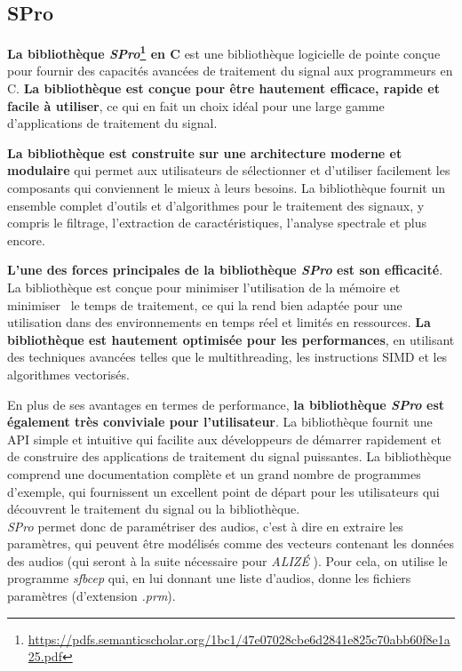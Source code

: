 \subsection{SPro}
\label{subsec:SPro}

\textbf{La bibliothèque \textit{SPro}\footnote{\url{https://pdfs.semanticscholar.org/1bc1/47e07028cbe6d2841e825c70abb60f8e1a25.pdf}} en C} est une bibliothèque logicielle de pointe conçue pour fournir des capacités avancées de traitement du signal
aux programmeurs en C. \textbf{La bibliothèque est conçue pour être hautement efficace, rapide et facile à utiliser}, ce qui en fait un choix idéal
pour une large gamme d'applications de traitement du signal.

\textbf{La bibliothèque est construite sur une architecture moderne et modulaire} qui permet aux utilisateurs de sélectionner et d'utiliser facilement
les composants qui conviennent le mieux à leurs besoins. La bibliothèque fournit un ensemble complet d'outils et d'algorithmes pour le traitement des signaux,
y compris le filtrage, l'extraction de caractéristiques, l'analyse spectrale et plus encore.

\textbf{L'une des forces principales de la bibliothèque \textit{SPro} est son efficacité}. La bibliothèque est conçue pour minimiser l'utilisation de la mémoire et minimiser \
le temps de traitement, ce qui la rend bien adaptée pour une utilisation dans des environnements en temps réel et limités en ressources. \textbf{La bibliothèque est hautement optimisée pour
      les performances}, en utilisant des techniques avancées telles que le multithreading, les instructions SIMD et les algorithmes vectorisés.

En plus de ses avantages en termes de performance, \textbf{la bibliothèque \textit{SPro} est également très conviviale pour l'utilisateur}.
La bibliothèque fournit une API simple et intuitive qui facilite aux développeurs de démarrer rapidement et de construire des applications de
traitement du signal puissantes. La bibliothèque comprend une documentation complète et un grand nombre de programmes d'exemple, qui fournissent
un excellent point de départ pour les utilisateurs qui découvrent le traitement du signal ou la bibliothèque.\\

\textit{ SPro} permet donc de paramétriser des audios, c'est à dire en extraire les paramètres, qui peuvent être modélisés comme des vecteurs contenant les
données des audios (qui seront à la suite nécessaire pour \textit{ALIZÉ} ).
Pour cela, on utilise le programme \textit{sfbcep} qui, en lui donnant une liste d'audios, donne les fichiers paramètres (d'extension \textit{.prm}).

